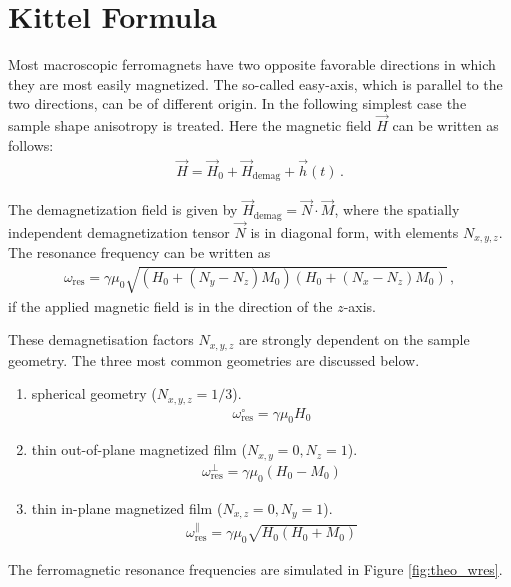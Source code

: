 \newpage
\section{Kittel Formula}\label{sec:theo_Kittel}
Most macroscopic ferromagnets have two opposite favorable directions in which they are most easily magnetized. The so-called easy-axis, which is parallel to the two directions, can be of different origin. In the following simplest case the sample shape anisotropy is treated. Here the magnetic field $\vec{H}$ can be written as follows:
\begin{align}
    \vec{H}=\vec{H}_0+\vec{H}_\text{demag}+\vec{h}(t)\,.
\end{align}

The demagnetization field is given by $\vec{H}_\text{demag}=\vec{N}\cdot\vec{M}$, where the spatially independent demagnetization tensor $\vec{N}$ is in diagonal form, with elements $N_{x,y,z}$.
The resonance frequency can be written as
\begin{align}
    \omega_\text{res}=\gamma\mu_0\sqrt{\left(H_0+(N_y-N_z)M_0\right)\left(H_0+(N_x-N_z)M_0\right)}\,,\label{formula:kittel}
\end{align}
if the applied magnetic field is in the direction of the $z$-axis.

These demagnetisation factors $N_{x,y,z}$ are strongly dependent on the sample geometry. The three most common geometries are discussed below. 
\begin{enumerate}
    \item spherical geometry ($N_{x,y,z}=1/3$).
    \begin{align}
        \omega_\text{res}^\circ=\gamma\mu_0H_0\label{formula:kittel1}
    \end{align}
    \item thin out-of-plane magnetized film ($N_{x,y}=0, N_z=1$).
    \begin{align}
        \omega_\text{res}^\perp=\gamma\mu_0(H_0-M_0)\label{formula:kittel2}
    \end{align}
    \item thin in-plane magnetized film ($N_{x,z}=0, N_y=1$).
    \begin{align}
        \omega_\text{res}^\parallel=\gamma\mu_0\sqrt{H_0(H_0+M_0)}\label{formula:kittel3}
    \end{align}
\end{enumerate}
The ferromagnetic resonance frequencies are simulated in Figure \ref{fig:theo_wres}. 

